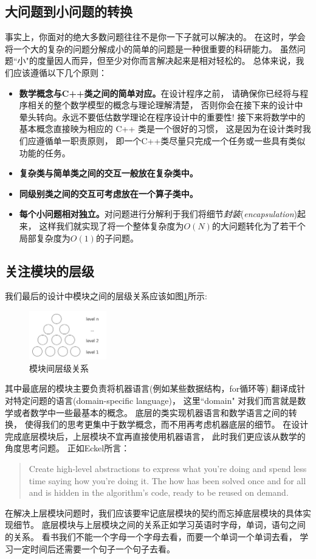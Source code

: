 \subsection{大问题到小问题的转换}
事实上，你面对的绝大多数问题往往不是你一下子就可以解决的。
在这时，学会将一个大的复杂的问题分解成小的简单的问题是一种很重要的科研能力。
虽然问题``小"的度量因人而异，但至少对你而言解决起来是相对轻松的。 
总体来说，我们应该遵循以下几个原则：
\begin{itemize}
\item \textbf{数学概念与C++类之间的简单对应。}在设计程序之前，
  请确保你已经将与程序相关的整个数学模型的概念与理论理解清楚，
  否则你会在接下来的设计中晕头转向。永远不要低估数学理论在程序设计中的重要性!
  接下来将数学中的基本概念直接映为相应的 C++ 类是一个很好的习惯， 
  这是因为在设计类时我们应遵循单一职责原则，
  即一个C++类尽量只完成一个任务或一些具有类似功能的任务。
\item \textbf{复杂类与简单类之间的交互一般放在复杂类中。}
\item \textbf{同级别类之间的交互可考虑放在一个算子类中。}
\item \textbf{每个小问题相对独立。}对问题进行分解利于我们将细节\emph{封装}(\emph{encapsulation})起来，
  这样我们就实现了将一个整体复杂度为$O(N)$的大问题转化为了若干个局部复杂度为$O(1)$的子问题。 
\end{itemize}

\subsection{关注模块的层级}
我们最后的设计中模块之间的层级关系应该如图\ref{fig:hierarchy}所示:
\begin{figure}[ht]
  \centering
  \includegraphics[width=0.30\textwidth]{png/hierarchy}
  \caption{模块间层级关系}
  \label{fig:hierarchy}
\end{figure}

其中最底层的模块主要负责将机器语言(例如某些数据结构，for循环等)
翻译成针对特定问题的语言(domain-specific language)，
这里``domain" 对我们而言就是数学或者数学中一些最基本的概念。
底层的类实现机器语言和数学语言之间的转换，
使得我们的思考更集中于数学概念，而不用再考虑机器底层的细节。
在设计完成底层模块后，上层模块不宜再直接使用机器语言，
此时我们更应该从数学的角度思考问题。
正如Eckel所言：
\begin{quote}
  Create high-level abstractions to express what you're doing 
  and spend less time saying how you're doing it.
  The how has been solved once and for all and 
  is hidden in the algorithm's code, ready to be reused on demand.
\end{quote} 
在解决上层模块问题时，我们应该要牢记底层模块的契约而忘掉底层模块的具体实现细节。
底层模块与上层模块之间的关系正如学习英语时字母，单词，语句之间的关系。 
看书我们不能一个字母一个字母去看，而要一个单词一个单词去看，
学习一定时间后还需要一个句子一个句子去看。


